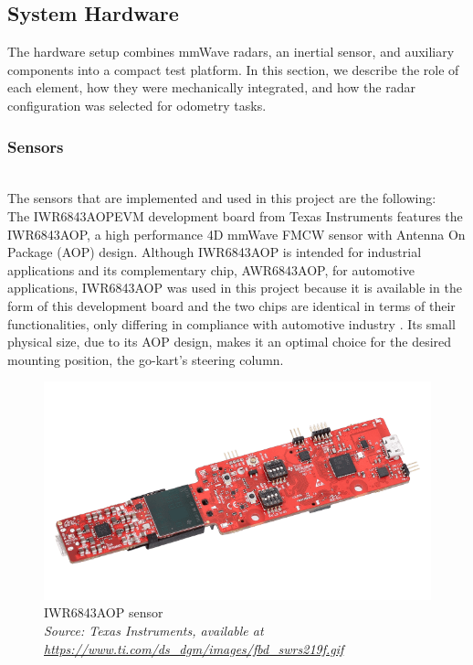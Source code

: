 \subsection{System Hardware}

The hardware setup combines mmWave radars, an inertial sensor, and auxiliary components into a compact test platform.  
In this section, we describe the role of each element, how they were mechanically integrated, and how the radar configuration was selected for odometry tasks.  

\subsubsection{Sensors}
\hfill
\\
The sensors that are implemented and used in this project are the following:
\hfill
\\
The IWR6843AOPEVM development board from Texas Instruments features the IWR6843AOP, a high performance 4D mmWave FMCW sensor with Antenna On Package (AOP) design.
Although IWR6843AOP is intended for industrial applications and its complementary chip, AWR6843AOP, for automotive applications, IWR6843AOP was used in this project because it is available in the form of this development board and the two chips are identical in terms of their functionalities, only differing in compliance with automotive  industry \cite{iwr_awr_diff}.
Its small physical size, due to its AOP design, makes it an optimal choice for the desired mounting position, the go-kart's steering column.
\begin{figure}[!htbp]
    \centering
    \includegraphics[width=0.7\linewidth]{images/iwr6843aopevm-angled.png}
    \caption{IWR6843AOP sensor\\
    \textit{Source: Texas Instruments, available at \url{https://www.ti.com/ds_dgm/images/fbd_swrs219f.gif}}}
    \label{fig:IWR6843AOP sensor}
\end{figure}


